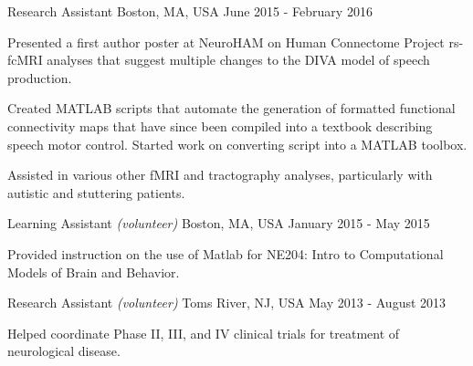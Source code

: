 \begin{cventries}
    {Research Assistant}
    {Boston, MA, USA}
    {June 2015 - February 2016}
    {\begin{cvitems}
        \item{Presented a first author poster at NeuroHAM on Human Connectome Project
            rs-fcMRI analyses that suggest multiple changes to the DIVA model of speech
            production.\vspace*{0.1cm}}
        \item{Created MATLAB scripts that automate the generation of formatted functional
            connectivity maps that have since been compiled into a textbook describing
            speech motor control. Started work on converting script into a MATLAB
            toolbox.\vspace*{0.1cm}}
        \item{Assisted in various other fMRI and tractography analyses, particularly
            with autistic and stuttering patients.}
    \end{cvitems}}
    \vspace*{0.2cm}
    
    {Learning Assistant \textnormal{\small{\textit{(volunteer)}}}}
    {Boston, MA, USA}
    {January 2015 - May 2015}
    {\begin{cvitems}
        \item{Provided instruction on the use of Matlab for NE204: Intro to Computational
            Models of Brain and Behavior.}
    \end{cvitems}}
    \vspace*{0.2cm}
    
    {Research Assistant \textnormal{\small{\textit{(volunteer)}}}}
    {Toms River, NJ, USA}
    {May 2013 - August 2013}
    {\begin{cvitems}
        \item{Helped coordinate Phase II, III, and IV clinical trials for treatment of
            neurological disease.}
    \end{cvitems}}
    
\end{cventries}
